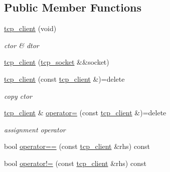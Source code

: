 \subsection*{Public Member Functions}
\begin{DoxyCompactItemize}
\item 
\mbox{\label{classtacopie_1_1tcp__client_a9293d5ef2b804f17d778504165ba0c52}} 
\hyperlink{classtacopie_1_1tcp__client_a9293d5ef2b804f17d778504165ba0c52}{tcp\+\_\+client} (void)
\begin{DoxyCompactList}\small\item\em ctor \& dtor \end{DoxyCompactList}\item 
\hyperlink{classtacopie_1_1tcp__client_a773fbcbb5b79324c8d065e363de73282}{tcp\+\_\+client} (\hyperlink{classtacopie_1_1tcp__socket}{tcp\+\_\+socket} \&\&socket)
\item 
\mbox{\label{classtacopie_1_1tcp__client_a5e326782c52f63814cc8f42a901ffaf6}} 
\hyperlink{classtacopie_1_1tcp__client_a5e326782c52f63814cc8f42a901ffaf6}{tcp\+\_\+client} (const \hyperlink{classtacopie_1_1tcp__client}{tcp\+\_\+client} \&)=delete
\begin{DoxyCompactList}\small\item\em copy ctor \end{DoxyCompactList}\item 
\mbox{\label{classtacopie_1_1tcp__client_aeadcfb8cd727b2917ebcd357311d0a6b}} 
\hyperlink{classtacopie_1_1tcp__client}{tcp\+\_\+client} \& \hyperlink{classtacopie_1_1tcp__client_aeadcfb8cd727b2917ebcd357311d0a6b}{operator=} (const \hyperlink{classtacopie_1_1tcp__client}{tcp\+\_\+client} \&)=delete
\begin{DoxyCompactList}\small\item\em assignment operator \end{DoxyCompactList}\item 
bool \hyperlink{classtacopie_1_1tcp__client_af7a1796c04efd00542349ecab692e073}{operator==} (const \hyperlink{classtacopie_1_1tcp__client}{tcp\+\_\+client} \&rhs) const
\item 
bool \hyperlink{classtacopie_1_1tcp__client_af352b6b1e939c919aec2761517051eb9}{operator!=} (const \hyperlink{classtacopie_1_1tcp__client}{tcp\+\_\+client} \&rhs) const
\item 

\end{DoxyCompactItemize}
